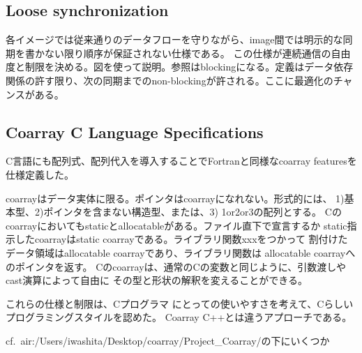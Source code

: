 \subsection{Loose synchronization}
各イメージでは従来通りのデータフローを守りながら、image間では明示的な同期を書かない限り順序が保証されない仕様である。
この仕様が連続通信の自由度と制限を決める。図を使って説明。参照はblockingになる。定義はデータ依存関係の許す限り、次の同期までのnon-blockingが許される。ここに最適化のチャンスがある。


\subsection{Coarray C Language Specifications}

C言語にも配列式、配列代入を導入することでFortranと同様なcoarray featuresを仕様定義した。

coarrayはデータ実体に限る。ポインタはcoarrayになれない。形式的には、
1)基本型、2)ポインタを含まない構造型、または、3) 1or2or3の配列とする。
Cのcoarrayにおいてもstaticとallocatableがある。ファイル直下で宣言するか
static指示したcoarrayはstatic coarrayである。ライブラリ関数xxxをつかって
割付けたデータ領域はallocatable coarrayであり、ライブラリ関数は
allocatable coarrayへのポインタを返す。
Cのcoarrayは、通常のCの変数と同じように、引数渡しやcast演算によって自由に
その型と形状の解釈を変えることができる。

これらの仕様と制限は、Cプログラマ
にとっての使いやすさを考えて、Cらしいプログラミングスタイルを認めた。
Coarray C++とは違うアプローチである。

cf.\ air:/Users/iwashita/Desktop/coarray/Project\_Coarray/の下にいくつか
